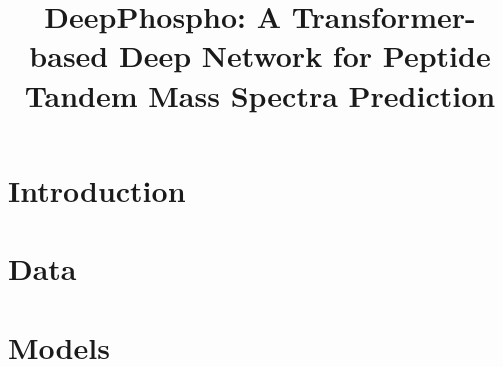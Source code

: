 \documentclass[final]{cvpr}
\begin{document}
\title{DeepPhospho: A Transformer-based Deep Network for Peptide \\Tandem Mass Spectra Prediction}


\maketitle


\section{Introduction}


\section{Data}


\section{Models}


{\small


}
\end{document}
